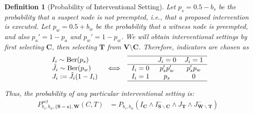 \documentclass[twoside,11pt]{article}
\newtheorem{definition}{Definition}
\begin{document}
\begin{definition}[Probability of Interventional Setting]
    Let $p_s = 0.5 - b_s$ be the probability that a suspect node is not preempted, i.e., that a proposed intervention is executed. Let $p_w = 0.5 + b_w$ be the probability that a witness node is preempted, and also $p_a' = 1-p_a$ and $p_w' = 1-p_w$. We will obtain interventional settings by first selecting $\mathbf{C}$, then selecting $\mathbf{T}$ from $\mathbf{V} \setminus \mathbf{C}$. Therefore, indicators are chosen as 
    \[
    \begin{array}{ccc}
    \begin{array}{l}
    I_i \sim \mathrm{Ber}(p_s) \\
    \tilde{J}_i \sim \mathrm{Ber}(p_w) \\
    J_i := \tilde{J}_i (1 - I_i)
    \end{array}
    & \Longleftrightarrow &
    \begin{tabular}{lcc}
    \hline
     & $J_i = 0$ & $J_i = 1$ \\
    \hline
    $I_i = 0$ & $p_s'p_w'$ & $p_s'p_w$ \\
    $I_i = 1$ & $p_s$ & $0$ \\
    \hline
    \end{tabular}
    \end{array}
    \]

    \noindent Thus, the probability of any particular interventional setting is:
\begin{align}\label{eq:psetawct}
P^{\mathit{set}}_{b_s,b_w, \{\mathbf{S}=\mathbf{s}\}, \mathbf{W}}(C,T) & = P_{b_s, b_w}\left(I_{\mathbf{C}} \wedge I^-_{\mathbf{S} \backslash \mathbf{C}}  \wedge  J_\mathbf{T}  \wedge J^-_{\mathbf{W} \backslash \mathbf{T}} \right)   %
\end{align}
\end{definition}
\noindent 



        
\end{document}
